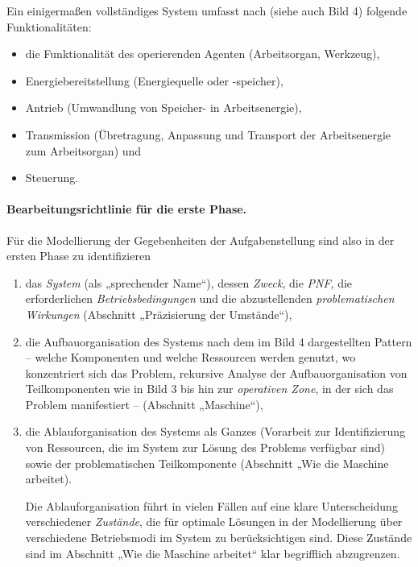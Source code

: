 \documentclass[11pt,a4paper]{article}
\begin{document}
Ein einigermaßen vollständiges System umfasst nach \cite[S. 39]{TESE2018}
(siehe auch Bild 4) folgende Funktionalitäten:
\begin{itemize}[noitemsep]
\item die Funktionalität des operierenden Agenten (Arbeitsorgan, Werkzeug),
\item Energiebereitstellung (Energiequelle oder -speicher),
\item Antrieb (Umwandlung von Speicher- in Arbeitsenergie),
\item Transmission (Übretragung, Anpassung und Transport der Arbeitsenergie
  zum Arbeitsorgan) und
\item Steuerung.
\end{itemize}

\paragraph{Bearbeitungsrichtlinie für die erste Phase.}
Für die Modellierung der Gegebenheiten der Aufgabenstellung sind also in der
ersten Phase zu identifizieren 
\begin{enumerate}\itemsep0pt
\item das \emph{System} (als „sprechender Name“), dessen \emph{Zweck}, die
  \emph{PNF}, die erforderlichen \emph{Betriebsbedingungen} und die
  abzustellenden \emph{problematischen Wirkungen} (Abschnitt „Prä\-zi\-sierung
  der Umstände“),
\item die Aufbauorganisation des Systems nach dem im Bild 4 dargestellten
  Pattern -- welche Komponenten und welche Ressourcen werden genutzt, wo
  konzentriert sich das Problem, rekursive Analyse der Aufbauorganisation von
  Teilkomponenten wie in Bild 3 bis hin zur \emph{operativen Zone}, in der
  sich das Problem manifestiert -- (Abschnitt „Maschine“),
\item die Ablauforganisation des Systems als Ganzes (Vorarbeit zur
  Identifizierung von Ressourcen, die im System zur Lösung des Problems
  verfügbar sind) sowie der problematischen Teilkomponente (Abschnitt „Wie die
  Maschine arbeitet).
  
  Die Ablauforganisation führt in vielen Fällen auf eine klare Unterscheidung
  verschiedener \emph{Zustände}, die für optimale Lösungen in der Modellierung
  über verschiedene Betriebsmodi im System zu berücksichtigen sind.  Diese
  Zustände sind im Abschnitt „Wie die Maschine arbeitet“ klar begrifflich
  abzugrenzen.
\end{enumerate}
\end{document}
